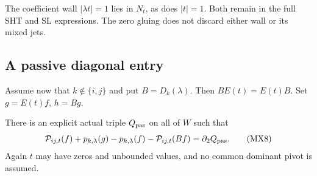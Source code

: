 The coefficient wall $|\lambda t|=1$ lies in $N_t$, as does
$|t|=1$.  Both remain in the full SHT and SL expressions.
The zero gluing does not discard either wall or its mixed jets.

\subsection{A passive diagonal entry}

Assume now that $k\notin\{i,j\}$ and put $B=D_k(\lambda)$.
Then $BE(t)=E(t)B$.  Set $g=E(t)f$, $h=Bg$.

\begin{theorem}
There is an explicit actual triple $Q_{\rm pas}$ on all of $W$
such that
\[
 \mathcal P_{ij,t}(f)+p_{k,\lambda}(g)
       -p_{k,\lambda}(f)-\mathcal P_{ij,t}(Bf)
                                      =\partial_2Q_{\rm pas}.
                                                               \tag{MX8}
\]
Again $t$ may have zeros and unbounded values, and no common
dominant pivot is assumed.
\end{theorem}

